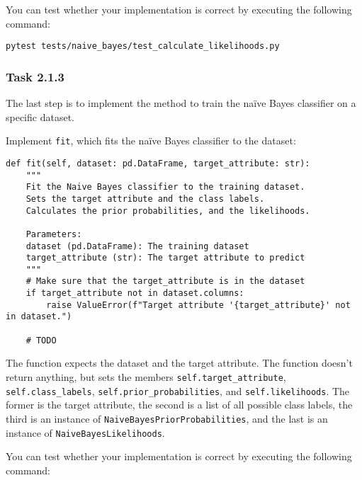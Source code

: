 \documentclass[
english,
smallborders
]{i6prcsht}
\begin{document}
You can test whether your implementation is correct by executing the following command:

\vspace*{0.3cm}

\begin{lstlisting}
pytest tests/naive_bayes/test_calculate_likelihoods.py
\end{lstlisting}

\vspace*{0.1cm}

\subsubsection*{Task 2.1.3}

The last step is to implement the method to train the naïve Bayes classifier on a specific dataset.

Implement \texttt{fit}, which fits the naïve Bayes classifier to the dataset:

\vspace*{0.3cm}

\begin{lstlisting}
def fit(self, dataset: pd.DataFrame, target_attribute: str):
	"""
	Fit the Naive Bayes classifier to the training dataset.
	Sets the target attribute and the class labels.
	Calculates the prior probabilities, and the likelihoods.

	Parameters:
	dataset (pd.DataFrame): The training dataset
	target_attribute (str): The target attribute to predict
	"""
	# Make sure that the target_attribute is in the dataset
	if target_attribute not in dataset.columns:
		raise ValueError(f"Target attribute '{target_attribute}' not in dataset.")

	# TODO
\end{lstlisting}

\vspace*{0.1cm}

The function expects the dataset and the target attribute. The function doesn't return anything, but sets the members \texttt{self.target\_attribute}, \texttt{self.class\_labels}, \texttt{self.prior\_probabilities}, and \texttt{self.likelihoods}. The former is the target attribute, the second is a list of all possible class labels, the third is an instance of \texttt{NaiveBayesPriorProbabilities}, and the last is an instance of \texttt{NaiveBayesLikelihoods}.

You can test whether your implementation is correct by executing the following command:
\end{document}
